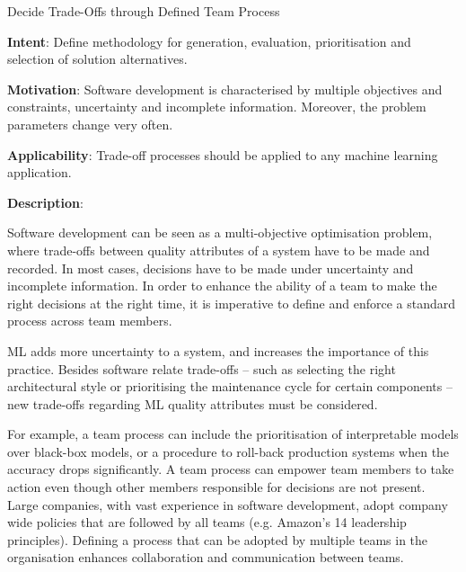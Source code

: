   
  \begin{frame}[plain]{ Decide Trade-Offs through Defined Team Process
 }

  \textbf{Intent}: Define methodology for generation, evaluation, prioritisation and selection of solution alternatives. 
 

  \textbf{Motivation}:  Software development is characterised by multiple objectives and constraints, uncertainty and incomplete information. Moreover, the problem parameters change very often. 
 

  \textbf{Applicability}: Trade-off processes should be applied to any machine learning application. 
 

  \textbf{Description}: 

Software development can be seen as a multi-objective optimisation problem, where trade-offs between quality attributes of a system have to be made and recorded.
In most cases, decisions have to be made under uncertainty and incomplete information.
In order to enhance the ability of a team to make the right decisions at the right time, it is imperative to define and enforce a standard process across team members.


ML adds more uncertainty to a system, and increases the importance of this practice.
Besides software relate trade-offs -- such as selecting the right architectural style or prioritising the maintenance cycle for certain components -- new trade-offs regarding ML quality attributes must be considered.


For example, a team process can include the prioritisation of interpretable models over black-box models, or a procedure to roll-back production systems when the accuracy drops significantly.
A team process can empower team members to take action even though other members responsible for decisions are not present.
Large companies, with vast experience in software development, adopt company wide policies that are followed by all teams (e.g. Amazon's 14 leadership principles).
Defining a process that can be adopted by multiple teams in the organisation enhances collaboration and communication between teams.


 


  \end{frame}

